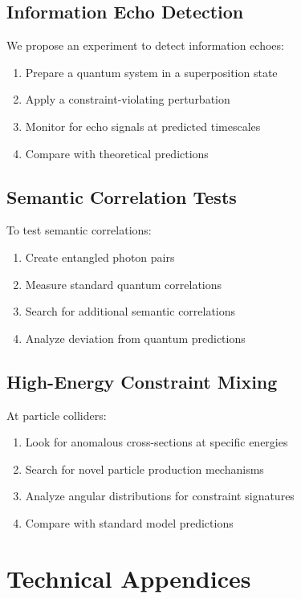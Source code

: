 \documentclass[11pt,a4paper]{article}
\begin{document}
\subsection{Information Echo Detection}

We propose an experiment to detect information echoes:

\begin{enumerate}
\item Prepare a quantum system in a superposition state
\item Apply a constraint-violating perturbation
\item Monitor for echo signals at predicted timescales
\item Compare with theoretical predictions
\end{enumerate}

\subsection{Semantic Correlation Tests}

To test semantic correlations:

\begin{enumerate}
\item Create entangled photon pairs
\item Measure standard quantum correlations
\item Search for additional semantic correlations
\item Analyze deviation from quantum predictions
\end{enumerate}

\subsection{High-Energy Constraint Mixing}

At particle colliders:

\begin{enumerate}
\item Look for anomalous cross-sections at specific energies
\item Search for novel particle production mechanisms
\item Analyze angular distributions for constraint signatures
\item Compare with standard model predictions
\end{enumerate}

\section{Technical Appendices}
\end{document}
